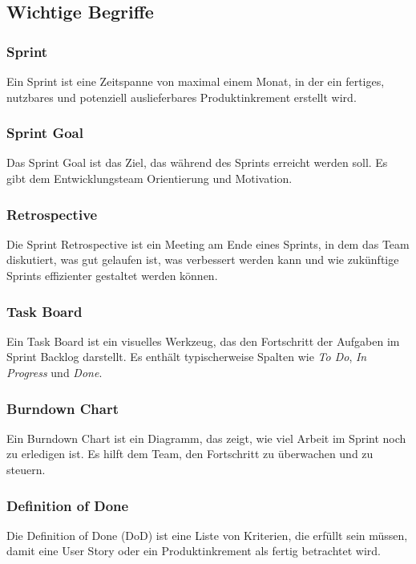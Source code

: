 \subsection{Wichtige Begriffe}

\subsubsection{Sprint}
Ein Sprint ist eine Zeitspanne von maximal einem Monat, in der ein fertiges, nutzbares und potenziell auslieferbares Produktinkrement erstellt wird.

\subsubsection{Sprint Goal}
Das Sprint Goal ist das Ziel, das während des Sprints erreicht werden soll. Es gibt dem Entwicklungsteam Orientierung und Motivation.

\subsubsection{Retrospective}
Die Sprint Retrospective ist ein Meeting am Ende eines Sprints, in dem das Team diskutiert, was gut gelaufen ist, was verbessert werden kann und wie zukünftige Sprints effizienter gestaltet werden können.

\subsubsection{Task Board}
Ein Task Board ist ein visuelles Werkzeug, das den Fortschritt der Aufgaben im Sprint Backlog darstellt. Es enthält typischerweise Spalten wie \textit{To Do}, \textit{In Progress} und \textit{Done}.

\subsubsection{Burndown Chart}
Ein Burndown Chart ist ein Diagramm, das zeigt, wie viel Arbeit im Sprint noch zu erledigen ist. Es hilft dem Team, den Fortschritt zu überwachen und zu steuern.

\subsubsection{Definition of Done}
Die Definition of Done (DoD) ist eine Liste von Kriterien, die erfüllt sein müssen, damit eine User Story oder ein Produktinkrement als fertig betrachtet wird.

